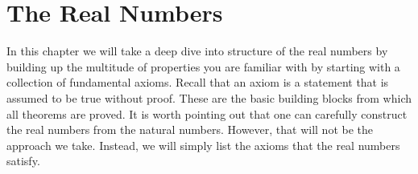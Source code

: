 \chapter{The Real Numbers}\label{chap:RealNumbers}

In this chapter we will take a deep dive into structure of the real numbers by building up the multitude of properties you are familiar with by starting with a collection of fundamental axioms. Recall that an axiom is a statement that is assumed to be true without proof. These are the basic building blocks from which all theorems are proved. It is worth pointing out that one can carefully construct the real numbers from the natural numbers.  However, that will not be the approach we take.  Instead, we will simply list the axioms that the real numbers satisfy.   